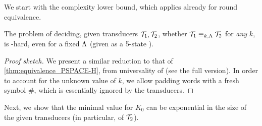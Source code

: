 We start with the complexity lower bound, which applies already for round equivalence.

\begin{theorem}
\label{thm:existential_equivalence_PSPACE-H}
The problem of deciding, given transducers $\mathcal{T}_1,\mathcal{T}_2$, whether $\mathcal{T}_1\equiv_{k,\Lambda} \mathcal{T}_2$ for \emph{any} $k$, is \PSPACE-hard, even for a fixed $\Lambda$ (given as a 5-state \DFA).
\end{theorem}
\begin{proof}[Proof sketch]
We present a similar reduction to that of \autoref{thm:equivalence_PSPACE-H}, from universality of \NFAs (see the full version). In order to account for the unknown value of $k$, we allow padding words with a fresh symbol $\#$, which is essentially ignored by the transducers. 
\end{proof}

Next, we show that the minimal value for $K_0$ can be exponential in the size of the given transducers (in particular, of $\mathcal{T}_2$).

